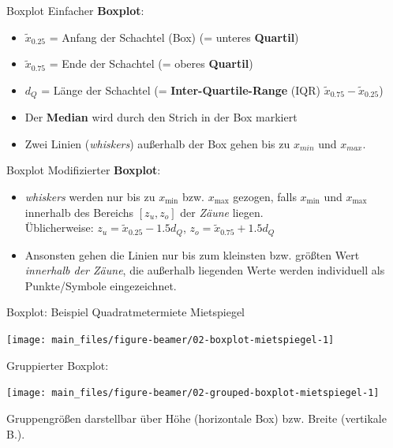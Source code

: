 \documentclass[
  10pt,
  ignorenonframetext,
]{beamer}
\providecommand{\tightlist}{%
  \setlength{\itemsep}{0pt}\setlength{\parskip}{0pt}}
\begin{document}
\begin{frame}{Boxplot}
\label{boxplot}
Einfacher \textbf{Boxplot}:

\begin{itemize}
\tightlist
\item
  \(\tilde x_{0.25}\) = Anfang der Schachtel (Box) (= unteres
  \textbf{Quartil})
\item
  \(\tilde x_{0.75}\) = Ende der Schachtel (= oberes \textbf{Quartil})
\item
  \(d_Q\) = Länge der Schachtel (= \textbf{Inter-Quartile-Range} (IQR)
  \(\tilde x_{0.75} - \tilde x_{0.25}\))
\item
  Der \textbf{Median} wird durch den Strich in der Box markiert
\item
  Zwei Linien (\emph{whiskers}) außerhalb der Box gehen bis zu
  \(x_{min}\) und \(x_{max}\).
\end{itemize}
\end{frame}

\begin{frame}{Boxplot}
\label{boxplot-1}
Modifizierter \textbf{Boxplot}:

\begin{itemize}
\tightlist
\item
  \emph{whiskers} werden nur bis zu \(x_{\min}\) bzw. \(x_{\max}\)
  gezogen, falls \(x_{\min}\) und \(x_{\max}\) innerhalb des Bereichs
  \([z_u,z_o]\) der \emph{Zäune} liegen.\\
  Üblicherweise: \(z_u = \tilde x_{0.25} - 1.5 d_Q\),
  \(z_o = \tilde x_{0.75} + 1.5 d_Q\)
\item
  Ansonsten gehen die Linien nur bis zum kleinsten bzw. größten Wert
  \emph{innerhalb der Zäune}, die außerhalb liegenden Werte werden
  individuell als Punkte/Symbole eingezeichnet.
\end{itemize}
\end{frame}

\begin{frame}{Boxplot: Beispiel Quadratmetermiete Mietspiegel}
\label{boxplot-beispiel-quadratmetermiete-mietspiegel}
\scriptsize

\begin{center}\texttt{[image: main\_files/figure-beamer/02-boxplot-mietspiegel-1]} \end{center}

\normalsize

\end{frame}

\begin{frame}{Gruppierter Boxplot:}
\label{gruppierter-boxplot}
\scriptsize

\begin{center}\texttt{[image: main\_files/figure-beamer/02-grouped-boxplot-mietspiegel-1]} \end{center}

\normalsize

\footnotesize Gruppengrößen darstellbar über Höhe (horizontale Box) bzw.
Breite (vertikale B.).
\end{frame}
\end{document}
